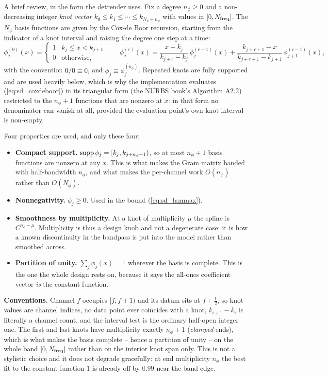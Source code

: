 \documentclass{article}
\numberwithin{equation}{section}   %
\begin{document}
A brief review, in the form the detrender uses.  Fix a degree $n_\phi \ge 0$ and a non-decreasing integer
{\em knot vector} $k_0 \le k_1 \le \cdots \le k_{N_\phi + n_\phi}$ with values in $[0, N_{\rm freq}]$.  The
$N_\phi$ basis functions are given by the Cox-de Boor recursion, starting from the indicator of a knot interval
and raising the degree one step at a time:
\begin{equation}
\phi^{(0)}_j(x) = \left\{\begin{array}{ll} 1 & k_j \le x < k_{j+1} \\ 0 & \mbox{otherwise,}\end{array}\right.
\qquad
\phi^{(r)}_j(x) = \frac{x - k_j}{k_{j+r} - k_j}\,\phi^{(r-1)}_j(x)
                + \frac{k_{j+r+1} - x}{k_{j+r+1} - k_{j+1}}\,\phi^{(r-1)}_{j+1}(x),
\label{eq:sd_coxdeboor}
\end{equation}
with the convention $0/0 \equiv 0$, and $\phi_j \equiv \phi^{(n_\phi)}_j$.  Repeated knots are fully supported
and are used heavily below, which is why the implementation evaluates (\ref{eq:sd_coxdeboor}) in its triangular
form (the NURBS book's Algorithm A2.2) restricted to the $n_\phi+1$ functions that are nonzero at $x$: in that
form no denominator can vanish at all, provided the evaluation point's own knot interval is non-empty.

Four properties are used, and only these four:
\begin{itemize}
\item {\bf Compact support.}  ${\rm supp}\,\phi_j = [k_j, k_{j+n_\phi+1})$, so at most $n_\phi+1$ basis
functions are nonzero at any $x$.  This is what makes the Gram matrix banded with half-bandwidth $n_\phi$, and
what makes the per-channel work $O(n_\phi)$ rather than $O(N_\phi)$.
\item {\bf Nonnegativity.}  $\phi_j \ge 0$.  Used in the bound (\ref{eq:sd_lammax}).
\item {\bf Smoothness by multiplicity.}  At a knot of multiplicity $\mu$ the spline is $C^{n_\phi - \mu}$.
Multiplicity is thus a design knob and not a degenerate case: it is how a known discontinuity in the bandpass
is put into the model rather than smoothed across.
\item {\bf Partition of unity.}  $\sum_j \phi_j(x) = 1$ wherever the basis is complete.  This is the one the
whole design rests on, because it says the all-ones coefficient vector {\em is} the constant function.
\end{itemize}

{\bf Conventions.}  Channel $f$ occupies $[f, f+1)$ and its datum sits at $f + \frac12$, so knot values are
channel indices, no data point ever coincides with a knot, $k_{i+1} - k_i$ is literally a channel count, and
the interval test is the ordinary half-open integer one.  The first and last knots have multiplicity exactly
$n_\phi + 1$ ({\em clamped} ends), which is what makes the basis complete -- hence a partition of unity -- on
the whole band $[0, N_{\rm freq}]$ rather than on the interior knot span only.  This is not a stylistic choice
and it does not degrade gracefully: at end multiplicity $n_\phi$ the best fit to the constant function $1$ is
already off by $0.99$ near the band edge.
\end{document}
